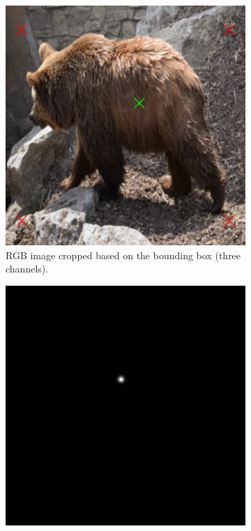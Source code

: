 \begin{figure}
	\centering
	\begin{subfigure}[t]{0.3\textwidth}
		\centering
		\includegraphics[width=\textwidth]{figures/chap34_channel_rgb.png}
		\caption{RGB image cropped based on the bounding box (three channels).}
		\label{fig:ch3:sec4:rgb_channel}
	\end{subfigure}
	\hfill
	\begin{subfigure}[t]{0.3\textwidth}
		\centering
		\includegraphics[width=\textwidth]{figures/chap34_channel_fg.png}

\end{subfigure}
\end{figure}
